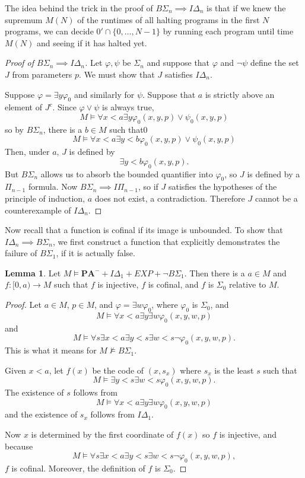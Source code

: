 \documentclass[12pt]{report}
\newcommand{\PA}{\mathbf{PA}}
\theoremstyle{definition}
\newtheorem{lemma}[theorem]{Lemma}
\begin{document}
The idea behind the trick in the proof of $B\Sigma_n \implies I\Delta_n$ is that if we knew the supremum $M(N)$ of the runtimes of all halting programs in the first $N$ programs, we can decide $0' \cap \{0, \dots, N-1\}$ by running each program until time $M(N)$ and seeing if it has halted yet.
\begin{proof}[Proof of $B\Sigma_n \implies I\Delta_n$]
Let $\varphi,\psi$ be $\Sigma_n$ and suppose that $\varphi$ and $\neg\psi$ define the set $J$ from parameters $p$. We must show that $J$ satisfies $I\Delta_n$.

Suppose $\varphi = \exists y\varphi_0$ and similarly for $\psi$. Suppose that $a$ is strictly above an element of $J^c$. Since $\varphi \vee \psi$ is always true,
$$M \models \forall x < a\exists y\varphi_0(x, y, p) \vee \psi_0(x, y, p)$$
so by $B\Sigma_n$, there is a $b \in M$ such that0
$$M \models \forall x < a\exists y<b\varphi_0(x, y, p) \vee \psi_0(x, y, p)$$
Then, under $a$, $J$ is defined by
$$\exists y<b\varphi_0(x, y, p).$$
But $B\Sigma_n$ allows us to absorb the bounded quantifier into $\varphi_0$, so $J$ is defined by a $\Pi_{n-1}$ formula.
Now $B\Sigma_n \implies I\Pi_{n-1}$, so if $J$ satisfies the hypotheses of the principle of induction, $a$ does not exist, a contradiction. Therefore $J$ cannot be a counterexample of $I\Delta_n$.
\end{proof}
Now recall that a function is cofinal if its image is unbounded. To show that $I \Delta_n \implies B\Sigma_n$, we first construct a function that explicitly demonstrates the failure of $B\Sigma_1$, if it is actually false.
\begin{lemma}
Let $M \models \PA^- + I\Delta_1 + EXP + \neg B\Sigma_1$. Then there is a $a \in M$ and $f: [0, a) \to M$ such that $f$ is injective, $f$ is cofinal, and $f$ is $\Sigma_0$ relative to $M$.
\end{lemma}
\begin{proof}
Let $a \in M$, $p \in M$, and $\varphi = \exists w \varphi_0$, where $\varphi_0$ is $\Sigma_0$, and
$$M \models \forall x<a \exists y\exists w\varphi_0(x, y, w, p)$$
 and
$$M \models \forall s \exists x<a\exists y<s\exists w<s\neg\varphi_0(x, y, w, p).$$
This is what it means for $M \not \models B\Sigma_1$.

Given $x<a$, let $f(x)$ be the code of $(x, s_x)$ where $s_x$ is the least $s$ such that
$$M \models \exists y<s\exists w<s\varphi_0(x, y, w, p).$$
The existence of $s$ follows from
$$M \models \forall x<a \exists y\exists w\varphi_0(x, y, w, p)$$
and the existence of $s_x$ follows from $I\Delta_1$.

Now $x$ is determined by the first coordinate of $f(x)$ so $f$ is injective, and because
$$M \models \forall s \exists x<a\exists y<s\exists w<s\neg\varphi_0(x, y, w, p),$$
$f$ is cofinal. Moreover, the definition of $f$ is $\Sigma_0$.
\end{proof}
\end{document}
